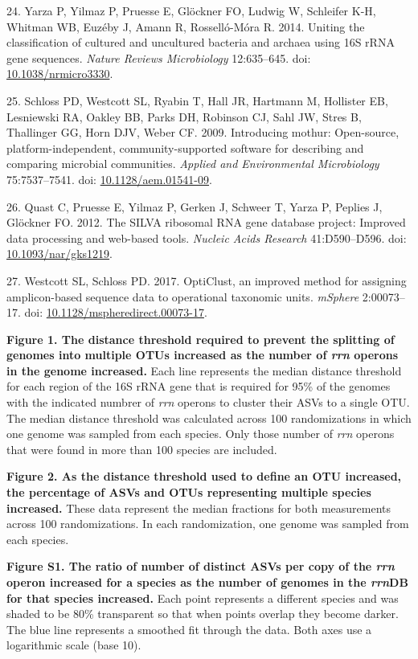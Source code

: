 \documentclass[
]{article}
\newenvironment{cslreferences}%
  {}%
  {\par}
\begin{document}
\begin{cslreferences}
\leavevmode\hypertarget{ref-Yarza2014}{}%
24. Yarza P, Yilmaz P, Pruesse E, Glöckner FO, Ludwig W, Schleifer K-H,
Whitman WB, Euzéby J, Amann R, Rosselló-Móra R. 2014. Uniting the
classification of cultured and uncultured bacteria and archaea using 16S
rRNA gene sequences. \emph{Nature Reviews Microbiology} 12:635--645.
doi: \href{https://doi.org/10.1038/nrmicro3330}{10.1038/nrmicro3330}.

\leavevmode\hypertarget{ref-Schloss2009}{}%
25. Schloss PD, Westcott SL, Ryabin T, Hall JR, Hartmann M, Hollister
EB, Lesniewski RA, Oakley BB, Parks DH, Robinson CJ, Sahl JW, Stres B,
Thallinger GG, Horn DJV, Weber CF. 2009. Introducing mothur:
Open-source, platform-independent, community-supported software for
describing and comparing microbial communities. \emph{Applied and
Environmental Microbiology} 75:7537--7541. doi:
\href{https://doi.org/10.1128/aem.01541-09}{10.1128/aem.01541-09}.

\leavevmode\hypertarget{ref-Quast2012}{}%
26. Quast C, Pruesse E, Yilmaz P, Gerken J, Schweer T, Yarza P, Peplies
J, Glöckner FO. 2012. The SILVA ribosomal RNA gene database project:
Improved data processing and web-based tools. \emph{Nucleic Acids
Research} 41:D590--D596. doi:
\href{https://doi.org/10.1093/nar/gks1219}{10.1093/nar/gks1219}.

\leavevmode\hypertarget{ref-Westcott2017}{}%
27. Westcott SL, Schloss PD. 2017. OptiClust, an improved method for
assigning amplicon-based sequence data to operational taxonomic units.
\emph{mSphere} 2:00073--17. doi:
\href{https://doi.org/10.1128/mspheredirect.00073-17}{10.1128/mspheredirect.00073-17}.
\end{cslreferences}

\setlength{\parindent}{0in}
\setlength{\leftskip}{0in}

\newpage

\textbf{Figure 1. The distance threshold required to prevent the
splitting of genomes into multiple OTUs increased as the number of
\emph{rrn} operons in the genome increased.} Each line represents the
median distance threshold for each region of the 16S rRNA gene that is
required for 95\% of the genomes with the indicated numbrer of
\emph{rrn} operons to cluster their ASVs to a single OTU. The median
distance threshold was calculated across 100 randomizations in which one
genome was sampled from each species. Only those number of \emph{rrn}
operons that were found in more than 100 species are included.

\textbf{Figure 2. As the distance threshold used to define an OTU
increased, the percentage of ASVs and OTUs representing multiple species
increased.} These data represent the median fractions for both
measurements across 100 randomizations. In each randomization, one
genome was sampled from each species.

\textbf{Figure S1. The ratio of number of distinct ASVs per copy of the
\emph{rrn} operon increased for a species as the number of genomes in
the \emph{rrn}DB for that species increased.} Each point represents a
different species and was shaded to be 80\% transparent so that when
points overlap they become darker. The blue line represents a smoothed
fit through the data. Both axes use a logarithmic scale (base 10).
\end{document}
